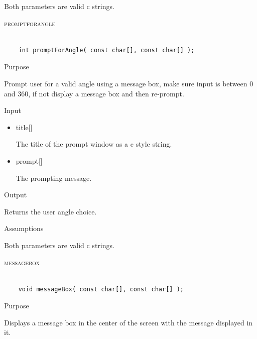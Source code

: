 \documentclass[pdftex, 11pt]{article}
\begin{document}
\begin{description}
\begin{description}
				Both parameters are valid c strings.

		\end{description}


	\item{\textsc{promptforangle}}

		\begin{lstlisting}

	int promptForAngle( const char[], const char[] );
		\end{lstlisting}

		\begin{description}
			\item{Purpose}

				Prompt user for a valid angle using a message box, make sure input is between
				0 and 360, if not display a message box and then re-prompt.

			\item{Input}

				\begin{itemize}
					
					\item{title[]}

						The title of the prompt window as a c style string.

					\item{prompt[]}

						The prompting message.

				\end{itemize}

			\item{Output}

				Returns the user angle choice.

			\item{Assumptions}

				Both parameters are valid c strings.

		\end{description}


	\item{\textsc{messagebox}}

		\begin{lstlisting}

	void messageBox( const char[], const char[] );
		\end{lstlisting}

		\begin{description}
			\item{Purpose}

				Displays a message box in the center of the screen with
				the message displayed in it.


\end{description}
\end{description}
\end{document}
